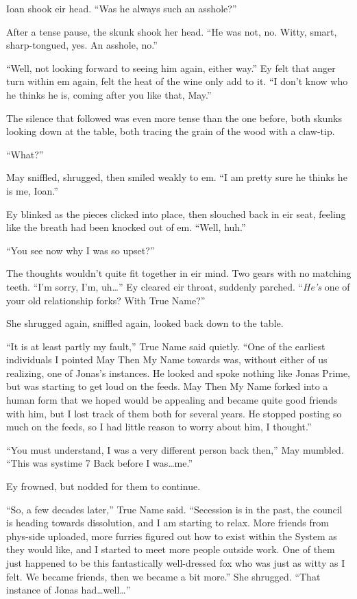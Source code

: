 Ioan shook eir head. ``Was he always such an asshole?''

After a tense pause, the skunk shook her head. ``He was not, no. Witty, smart, sharp-tongued, yes. An asshole, no.''

``Well, not looking forward to seeing him again, either way.'' Ey felt that anger turn within em again, felt the heat of the wine only add to it. ``I don't know who he thinks he is, coming after you like that, May.''

The silence that followed was even more tense than the one before, both skunks looking down at the table, both tracing the grain of the wood with a claw-tip.

``What?''

May sniffled, shrugged, then smiled weakly to em. ``I am pretty sure he thinks he is me, Ioan.''

Ey blinked as the pieces clicked into place, then slouched back in eir seat, feeling like the breath had been knocked out of em. ``Well, huh.''

``You see now why I was so upset?''

The thoughts wouldn't quite fit together in eir mind. Two gears with no matching teeth. ``I'm sorry, I'm, uh\ldots{}'' Ey cleared eir throat, suddenly parched. ``\emph{He's} one of your old relationship forks? With True Name?''

She shrugged again, sniffled again, looked back down to the table.

``It is at least partly my fault,'' True Name said quietly. ``One of the earliest individuals I pointed May Then My Name towards was, without either of us realizing, one of Jonas's instances. He looked and spoke nothing like Jonas Prime, but was starting to get loud on the feeds. May Then My Name forked into a human form that we hoped would be appealing and became quite good friends with him, but I lost track of them both for several years. He stopped posting so much on the feeds, so I had little reason to worry about him, I thought.''

``You must understand, I was a very different person back then,'' May mumbled. ``This was systime 7 Back before I was\ldots me.''

Ey frowned, but nodded for them to continue.

``So, a few decades later,'' True Name said. ``Secession is in the past, the council is heading towards dissolution, and I am starting to relax. More friends from phys-side uploaded, more furries figured out how to exist within the System as they would like, and I started to meet more people outside work. One of them just happened to be this fantastically well-dressed fox who was just as witty as I felt. We became friends, then we became a bit more.'' She shrugged. ``That instance of Jonas had\ldots well\ldots{}''

